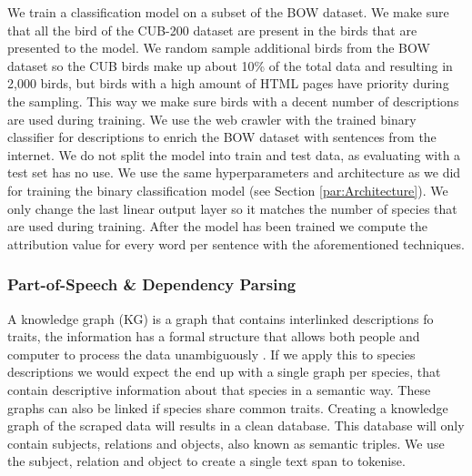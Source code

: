 \documentclass[a4paper, 12pt, oneside]{book} %
\begin{document}
We train a classification model on a subset of the BOW dataset.
We make sure that all the bird of the CUB-200 dataset are present in the birds that are presented to the model.
We random sample additional birds from the BOW dataset so the CUB birds make up about 10\% of the total data and resulting in 2,000 birds, but birds with a high amount of HTML pages have priority during the sampling.
This way we make sure birds with a decent number of descriptions are used during training.
We use the web crawler with the trained binary classifier for descriptions to enrich the BOW dataset with sentences from the internet.
We do not split the model into train and test data, as evaluating with a test set has no use.
We use the same hyperparameters and architecture as we did for training the binary classification model (see Section \ref{par:Architecture}).
We only change the last linear output layer so it matches the number of species that are used during training.
After the model has been trained we compute the attribution value for every word per sentence with the aforementioned techniques.


\subsubsection{Part-of-Speech \& Dependency Parsing} \label{par:PoS}
A knowledge graph (KG) is a graph that contains interlinked descriptions fo traits, the information has a formal structure that allows both people and computer to process the data unambiguously \autocite{petkova_crafting_2020}.
If we apply this to species descriptions we would expect the end up with a single graph per species, that contain descriptive information about that species in a semantic way.
These graphs can also be linked if species share common traits.
Creating a knowledge graph of the scraped data will results in a clean database.
This database will only contain subjects, relations and objects, also known as semantic triples. 
We use the subject, relation and object to create a single text span to tokenise.
\end{document}
